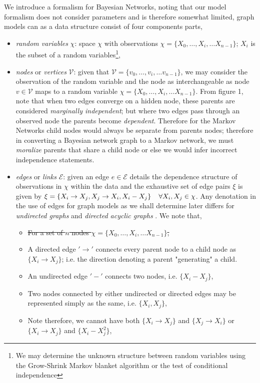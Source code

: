 \documentclass[7pt]{article}
\begin{document}
We introduce a formalism for  Bayesian Networks, noting that our model formalism does not consider parameters and is therefore somewhat limited, graph models can as a data structure consist of four components parts, 
\begin{itemize}
	\item \emph{random variables} $\chi$:  space $\chi$ with observations $\chi = \{X_0,…,X_i, … X_{n-1}\}$; $X_i$ is the subset of a random variables\footnote{We may determine the unknown structure between random variables using the Grow-Shrink Markov blanket algorithm or the test of conditional independence},
	\item \emph{nodes} or \emph{vertices} $\mathcal{V}$: given that $\mathcal{V}= \{v_0,…,v_i, … v_{n-1}\}$, we may consider the observation of the random variable and the node as interchangeable as {node} $v \in \mathcal{V}$ maps to a random variable  $\chi = \{X_0,…,X_i, … X_{n-1}\}$. From figure 1, note that when two edges converge on a hidden node, these parents are considered  \emph{marginally independent}; but where two edges pass through an observed node the parents become \emph{dependent}. Therefore for the Markov Networks child nodes would always be separate from  parents nodes; therefore in converting a Bayesian network graph to a Markov network, we must \emph{moralize} parents that share a child node or else we would infer incorrect independence statements.
	\item \emph{edges} or \emph{links} $\mathcal{E}$: given an edge $e \in \mathcal{E}$ details the dependence structure of observations in $\chi$ within the data and the exhaustive set of edge pairs $\xi$ is given by $\xi =\{X_i \rightarrow X_j, X_j \rightarrow X_i, X_i - X_j \} \hspace{0.15in} \forall X_i, X_j \in \chi$. Any denotation in the use of edges for graph models as we shall determine later differs for \emph{undirected graphs} and \emph{directed acyclic graphs} \cite{bang2008digraphs,diestel2017extremal}.  We note that,
	\begin{itemize}
		\item \st{For a set of $n$ nodes $\chi = \{X_0,…,X_i, … X_{n-1}\}$,}
		\item A directed edge $'\rightarrow'$ connects every parent node to a child node as $\{X_i \rightarrow X_j\}$; i.e. the direction denoting a parent "generating" a child. 
		\item An undirected edge $'-'$ connects two nodes, i.e. $\{X_i - X_j\}$,
		\item Two nodes connected by either undirected or directed edges  may be represented simply as the same, i.e.  $\{X_i , X_j \}$,
		\item Note therefore, we cannot have both $\{X_i \rightarrow X_j\}$ and $\{X_j \rightarrow X_i\}$ or $\{X_i \rightarrow X_j\}$ and $\{X_i - X_j^2\}$,
		

\end{itemize}
\end{itemize}
\end{document}

